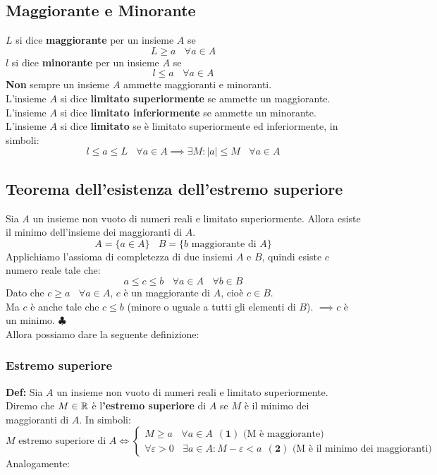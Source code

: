 \documentclass[../../main.tex]{subfiles}
\begin{document}
\subsection{Maggiorante e Minorante}
$L$ si dice \textbf{maggiorante} per un insieme $A$ se
\[
    L \geq a \ \ \ \ \forall a \in A
\]
$l$ si dice \textbf{minorante} per un insieme $A$ se
\[
    l \leq a \ \ \ \ \forall a \in A
\]
\textbf{Non} sempre un insieme $A$ ammette maggioranti e minoranti.\\
L'insieme $A$ si dice \textbf{limitato superiormente} se ammette un maggiorante.\\
L'insieme $A$ si dice \textbf{limitato inferiormente} se ammette un minorante.\\
L'insieme $A$ si dice \textbf{limitato} se è limitato superiormente ed inferiormente, in simboli:
\[
    l\leq a \leq L \ \ \ \ \forall a \in A \implies \exists M : |a| \leq M \ \ \ \ \forall a \in A
\]

\subsection{Teorema dell'esistenza dell'estremo superiore}
Sia $A$ un insieme non vuoto di numeri reali e limitato superiormente. Allora
esiste il minimo dell'insieme dei maggioranti di $A$.
\[
    A = \{a\in A\} \ \ \ \ B = \{b \text{ maggiorante di } A\}
\]
Applichiamo l'assioma di completezza di due insiemi $A$ e $B$, quindi esiste
$c$ numero reale tale che:
\[
    a \leq c \leq b \ \ \ \ \forall a \in A \ \ \ \ \forall b \in B
\]
Dato che $c \geq a \ \ \ \ \forall a \in A$, $c$ è un maggiorante di $A$, cioè
$c \in B$.\\ Ma $c$ è anche tale che $c\leq b$ (minore o uguale a tutti gli
elementi di $B$). $\implies c$ è un minimo. $\clubsuit$\\ Allora possiamo dare
la seguente definizione:\\
\subsubsection{Estremo superiore}
\textbf{Def:} Sia $A$ un insieme non vuoto di numeri
reali e limitato superiormente. Diremo che $M\in \mathbb{R}$ è l\textbf{'estremo
    superiore} di $A$ se $M$ è il minimo dei maggioranti di $A$. In simboli:
\[
    M \text{ estremo superiore di } A \iff \begin{cases}
        M \geq a  \ \ \ \ \forall a \in A \ \ (\textbf{1}) \text{ (M è maggiorante)} \\
        \forall \varepsilon > 0 \ \ \ \ \exists a \in A : M - \varepsilon < a \ \ (\textbf{2}) \text{ (M è il minimo dei maggioranti)}
    \end{cases}
\]
Analogamente:
\end{document}

